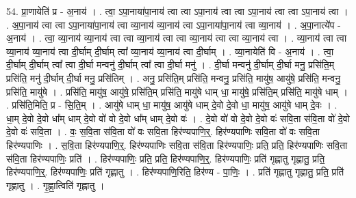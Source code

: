 \documentclass[17pt]{extarticle}
\begin{document}
54. प्रा॒णायेति॑ प्र - अ॒नाय॑ । . त्वा॒ ऽपा॒नाया॑पा॒नाय॑ त्वा त्वा ऽपा॒नाय॑ त्वा त्वा ऽपा॒नाय॑ त्वा त्वा ऽपा॒नाय॑ त्वा । . अ॒पा॒नाय॑ त्वा त्वा ऽपा॒नाया॑पा॒नाय॑ त्वा व्या॒नाय॑ व्या॒नाय॑ त्वा ऽपा॒नाया॑पा॒नाय॑ त्वा व्या॒नाय॑ । . अ॒पा॒नात्ये॑प - अ॒नाय॑ । . त्वा॒ व्या॒नाय॑ व्या॒नाय॑ त्वा त्वा व्या॒नाय॑ त्वा त्वा व्या॒नाय॑ त्वा त्वा व्या॒नाय॑ त्वा । . व्या॒नाय॑ त्वा त्वा व्या॒नाय॑ व्या॒नाय॑ त्वा दी॒र्घाम् दी॒र्घाम् त्वा᳚ व्या॒नाय॑ व्या॒नाय॑ त्वा दी॒र्घाम् । . व्या॒नायेति॑ वि - अ॒नाय॑ । . त्वा॒ दी॒र्घाम् दी॒र्घाम् त्वा᳚ त्वा दी॒र्घा मन्वनु॑ दी॒र्घाम् त्वा᳚ त्वा दी॒र्घा मनु॑ । . दी॒र्घा मन्वनु॑ दी॒र्घाम् दी॒र्घा मनु॒ प्रसि॑ति॒म् प्रसि॑ति॒ मनु॑ दी॒र्घाम् दी॒र्घा मनु॒ प्रसि॑तिम् । . अनु॒ प्रसि॑ति॒म् प्रसि॑ति॒ मन्वनु॒ प्रसि॑ति॒ मायु॑ष॒ आयु॑षे॒ प्रसि॑ति॒ मन्वनु॒ प्रसि॑ति॒ मायु॑षे । . प्रसि॑ति॒ मायु॑ष॒ आयु॑षे॒ प्रसि॑ति॒म् प्रसि॑ति॒ मायु॑षे धाम् धा॒ मायु॑षे॒ प्रसि॑ति॒म् प्रसि॑ति॒ मायु॑षे धाम् । . प्रसि॑ति॒मिति॒ प्र - सि॒ति॒म् । . आयु॑षे धाम् धा॒ मायु॑ष॒ आयु॑षे धाम् दे॒वो दे॒वो धा॒ मायु॑ष॒ आयु॑षे धाम् दे॒वः । . धा॒म् दे॒वो दे॒वो धा᳚म् धाम् दे॒वो वो॑ वो दे॒वो धा᳚म् धाम् दे॒वो वः॑ । . दे॒वो वो॑ वो दे॒वो दे॒वो वः॑ सवि॒ता स॑वि॒ता वो॑ दे॒वो दे॒वो वः॑ सवि॒ता । . वः॒ स॒वि॒ता स॑वि॒ता वो॑ वः सवि॒ता हिर॑ण्यपाणि॒र्॒. हिर॑ण्यपाणिः सवि॒ता वो॑ वः सवि॒ता हिर॑ण्यपाणिः । . स॒वि॒ता हिर॑ण्यपाणि॒र्॒. हिर॑ण्यपाणिः सवि॒ता स॑वि॒ता हिर॑ण्यपाणिः॒ प्रति॒ प्रति॒ हिर॑ण्यपाणिः सवि॒ता स॑वि॒ता हिर॑ण्यपाणिः॒ प्रति॑ । . हिर॑ण्यपाणिः॒ प्रति॒ प्रति॒ हिर॑ण्यपाणि॒र्॒. हिर॑ण्यपाणिः॒ प्रति॑ गृह्णातु गृह्णातु॒ प्रति॒ हिर॑ण्यपाणि॒र्॒. हिर॑ण्यपाणिः॒ प्रति॑ गृह्णातु । . हिर॑ण्यपाणि॒रिति॒ हिर॑ण्य - पा॒णिः॒ । . प्रति॑ गृह्णातु गृह्णातु॒ प्रति॒ प्रति॑ गृह्णातु । . गृ॒ह्णा॒त्विति॑ गृह्णातु । \newline
\pagebreak
{}
\end{document}
